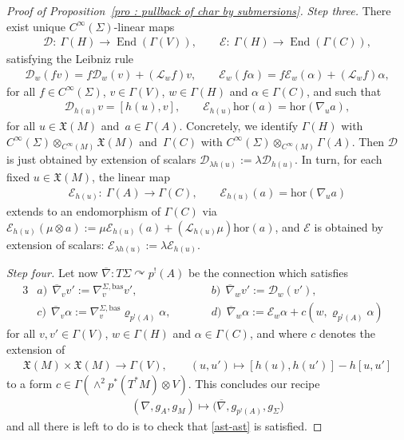 \documentclass[11pt]{article}
\numberwithin{equation}{section}
\newcommand{\rmap}{\longrightarrow}
\newcommand{\acts}{\curvearrowright}
\newcommand{\hor}{\mathrm{hor}}
\newcommand{\8}{\infty}
\newcommand{\X}{\mathfrak{X}}
\begin{document}
\begin{proof}[Proof of Proposition~\ref{pro : pullback of char by submersions}]
{\it Step three.} There exist unique $C^{\8}(\Sigma)$-linear maps
 \begin{gather*}
 \mathcal{D}\colon \ \Gamma(H) \to \operatorname{End}(\Gamma(V)), \qquad \mathcal{E}\colon \ \Gamma(H) \rmap \operatorname{End}(\Gamma(C)),
 \end{gather*}satisfying the Leibniz rule
 \begin{gather*}
 \mathcal{D}_{w}(fv) = f\mathcal{D}_{w}(v) + (\mathscr{L}_{w}f)v, \qquad \mathcal{E}_{w}(f\alpha) = f\mathcal{E}_{w}(\alpha)+(\mathscr{L}_wf)\alpha,
 \end{gather*}for all $f \in C^{\8}(\Sigma)$, $v \in \Gamma(V)$, $w \in \Gamma(H)$ and $\alpha \in \Gamma(C)$, and such that
 \begin{gather*}
 \mathcal{D}_{h(u)}v = [h(u),v], \qquad \mathcal{E}_{h(u)}\mathrm{hor}(a) = \mathrm{hor}(\nabla_ua),
 \end{gather*}for all $u \in \X(M)$ and~$a \in \Gamma(A)$. Concretely, we identify $\Gamma(H)$ with $C^{\8}(\Sigma) \otimes_{C^{\8}(M)} \X(M)$ and~$\Gamma(C)$ with $C^{\8}(\Sigma) \otimes_{C^{\8}(M)} \Gamma(A)$. Then $\mathcal{D}$ is just obtained by extension of scalars $\mathcal{D}_{\lambda h(u)}:=\lambda\mathcal{D}_{h(u)}$. In turn, for each fixed $u \in \X(M)$, the linear map
 \begin{gather*}
 \mathcal{E}_{h(u)}\colon \ \Gamma(A) \rmap \Gamma(C), \qquad \mathcal{E}_{h(u)}(a)=\mathrm{hor}(\nabla_ua)
 \end{gather*}extends to an endomorphism of $\Gamma(C)$ via $\mathcal{E}_{h(u)}(\mu \otimes a):=\mu \mathcal{E}_{h(u)}(a)+(\mathscr{L}_{h(u)}\mu)\hor(a)$, and $\mathcal{E}$ is obtained by extension of scalars: $\mathcal{E}_{\lambda h(u)}:=\lambda \mathcal{E}_{h(u)}$.

{\it Step four.} Let now $\overline{\nabla}\colon T\Sigma \acts p^!(A)$ be the connection which satisfies
 \begin{alignat*}{3}
& a) \ \ \overline{\nabla}_vv':=\nabla^{\Sigma,\mathrm{bas}}_{v}v', \qquad && b) \ \ \overline{\nabla}_{w}v':=\mathcal{D}_w(v'), & \\
& c) \ \ \overline{\nabla}_v\alpha:=\nabla^{\Sigma,\mathrm{bas}}_{v}\varrho_{p^!(A)}\alpha, \qquad && d) \ \ \overline{\nabla}_{w}\alpha:=\mathcal{E}_{w}\alpha+c(w,\varrho_{p^!(A)}\alpha)&
 \end{alignat*} for all $v,v' \in \Gamma(V)$, $w \in \Gamma(H)$ and $\alpha \in \Gamma(C)$, and where $c$ denotes the extension of
 \begin{gather*}
 \X(M) \times \X(M) \rmap \Gamma(V), \qquad (u,u') \mapsto [h(u),h(u')]-h[u,u']
 \end{gather*}to a form $c\in \Gamma(\wedge^2p^*(T^*M)\otimes V)$. This concludes our recipe
 \begin{gather*}
 (\nabla,g_A,g_M) \mapsto \big(\overline{\nabla},g_{p^!(A)},g_{\Sigma}\big)
 \end{gather*}and all there is left to do is to check that \eqref{ast-ast} is satisfied.


\end{proof}
\end{document}
